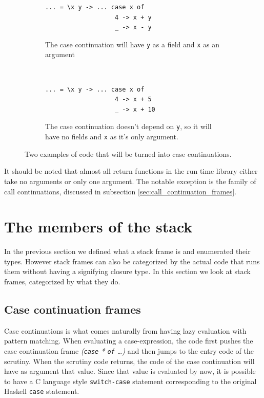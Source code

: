 \begin{figure}
\begin{mdframed}
        \begin{subfigure}[t]{0.5\textwidth}
          \begin{verbatim}
... = \x y -> ... case x of
                   4 -> x + y
                   _ -> x - y
          \end{verbatim}
          \caption{The case continuation will have \texttt{y} as a field
and \texttt{x} as an argument}
        \end{subfigure}
    ~ %
        \begin{subfigure}[t]{0.5\textwidth}
          \begin{verbatim}
... = \x y -> ... case x of
                   4 -> x + 5
                   _ -> x + 10
          \end{verbatim}
          \caption{The case continuation doesn't depend on \texttt{y},
so it will have no fields and \texttt{x} as it's only argument.}
        \end{subfigure}
  \caption{Two examples of code that will be turned into case
continuations.}
  \label{fig:field_and_arguments}
\end{mdframed}
\end{figure}

It should be noted that almost all return functions in the run time library
either take no arguments or only one argument. The notable exception is the
family of call continuations, discussed in subsection \ref{sec:call_continuation_frames}.

\section{The members of the stack}

In the previous section we defined what a stack frame is and enumerated
their types. However stack frames can also be categorized by the actual
code that runs them without having a signifying closure type. In this
section we look at stack frames, categorized by what they do.

\subsection{Case continuation frames}

Case continuations is what comes naturally from having lazy evaluation
with pattern matching. When evaluating a case-expression, the code first
pushes the case continuation frame \emph{(\texttt{case} * \texttt{of}
\dots)} and then jumps to the entry code of the scrutiny. When the
scrutiny code returns, the code of the case continuation will have
as argument that value. Since that value is evaluated by now, it is
possible to have a C language style \texttt{switch-case} statement
corresponding to the original Haskell \texttt{case} statement.

